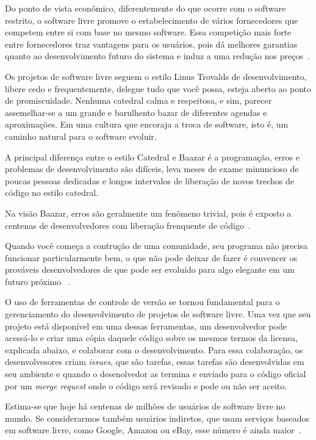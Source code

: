 Do ponto de vista econômico, diferentemente do que ocorre com o software 
restrito, o software livre promove o estabelecimento
de vários fornecedores que competem entre si com base no mesmo software. Essa competição 
mais forte entre fornecedores traz vantagens para os usuários, pois dá melhores
garantias quanto ao desenvolvimento futuro do sistema e induz a uma redução nos 
preços~\cite{kon2012software}.

Os projetos de software livre seguem o estilo Linus Trovalds de desenvolvimento, libere
cedo e frequentemente, delegue tudo que você possa, esteja aberto ao ponto de promiscuidade.
Nenhuma catedral calma e respeitosa, e sim, parecer assemelhar-se a um grande e barulhento 
bazar de diferentes agendas e aproximações. Em uma cultura que encoraja a troca de
software, isto é, um caminho natural para o software evoluir.

A principal diferença 
entre o estilo Catedral e Baazar é a programação, erros e problemas de desenvolvimento 
são difíceis, leva meses de exame minuncioso de poucas pessoas dedicadas e longos 
intervalos de liberação de novos trechos de código no estilo catedral.

Na visão 
Baazar, erros são geralmente um fenômeno trivial, pois é exposto a centenas de 
desenvolvedores com liberação frenquente de código~\cite{Raymond:1999:CB:580808}.

Quando você começa a contrução de uma comunidade, seu programa não precisa funcionar
particularmente bem, o que não pode deixar de fazer é convencer os prováveis 
desenvolvedores de que pode ser evoluído para algo elegante em um futuro próximo
~\cite{Raymond:1999:CB:580808}.

O uso de ferramentas de controle de versão se tornou fundamental para o gerenciamento
do desenvolvimento de projetos de software livre. Uma vez que seu projeto está 
disponível em uma dessas ferramentas, um desenvolvedor pode acessá-lo e criar
uma cópia daquele código sobre os mesmos termos da licensa, explicada abaixo, e 
colaborar com o desenvolvimento. Para essa colaboração, os desenvolvesores criam
\textit{issues}, que são tarefas, essas tarefas são desenvolvidas em seu ambiente
e quando o desenolvedor as termina e enviado para o código oficial por um 
\textit{merge request} onde o código será revisado e pode ou não ser aceito.

Estima-se que hoje há centenas de milhões de usuários de software livre no mundo. Se
considerarmos também usuários indiretos, que usam serviços baseados em software livre,
como Google, Amazon ou eBay, esse número é ainda maior~\cite{sabino2009licenccas}.


